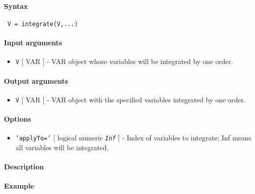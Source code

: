 


	\paragraph{Syntax}
 
 \begin{verbatim}
 V = integrate(V,...)
 \end{verbatim}
 
 \paragraph{Input arguments}
 
 \begin{itemize}
 \item
   \texttt{V} {[} VAR {]} - VAR object whose variables will be integrated
   by one order.
 \end{itemize}
 
 \paragraph{Output arguments}
 
 \begin{itemize}
 \item
   \texttt{V} {[} VAR {]} - VAR object with the specified variables
   integrated by one order.
 \end{itemize}
 
 \paragraph{Options}
 
 \begin{itemize}
 \item
   \texttt{'applyTo='} {[} logical \textbar{} numeric \textbar{}
   \emph{\texttt{Inf}} {]} - Index of variables to integrate; Inf means
   all variables will be integrated.
 \end{itemize}
 
 \paragraph{Description}
 
 \paragraph{Example}


